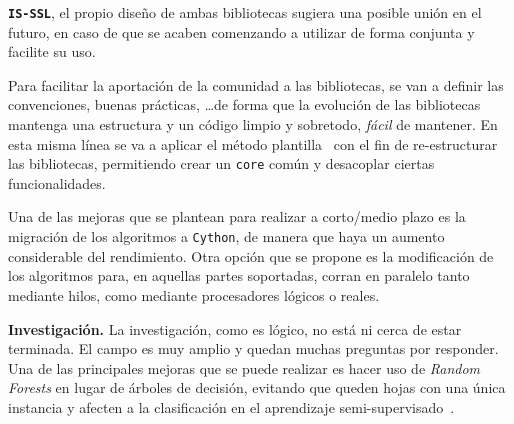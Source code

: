 \textbf{\texttt{IS-SSL}}, el propio diseño de ambas bibliotecas sugiera una posible unión en el futuro, en caso de que se acaben comenzando a utilizar de forma conjunta y facilite su uso. 

Para facilitar la aportación de la comunidad a las bibliotecas, se van a definir las convenciones, buenas prácticas, \ldots de forma que la evolución de las bibliotecas mantenga una estructura y un código limpio y sobretodo, \emph{fácil} de mantener. En esta misma línea se va a aplicar el método plantilla~\cite{shvets2021} con el fin de re-estructurar las bibliotecas, permitiendo crear un \texttt{core} común y desacoplar ciertas funcionalidades.

Una de las mejoras que se plantean para realizar a corto/medio plazo es la migración de los algoritmos a \texttt{Cython}, de manera que haya un aumento considerable del rendimiento. Otra opción que se propone es la modificación de los algoritmos para, en aquellas partes soportadas, corran en paralelo tanto mediante hilos, como mediante procesadores lógicos o reales.

\textbf{Investigación.} La investigación, como es lógico, no está ni cerca de estar terminada. El campo es muy amplio y quedan muchas preguntas por responder. Una de las principales mejoras que se puede realizar es hacer uso de \textit{Random Forests} en lugar de árboles de decisión, evitando que queden hojas con una única instancia y afecten a la clasificación en el aprendizaje semi-supervisado~\cite{tanha2017semi}.

